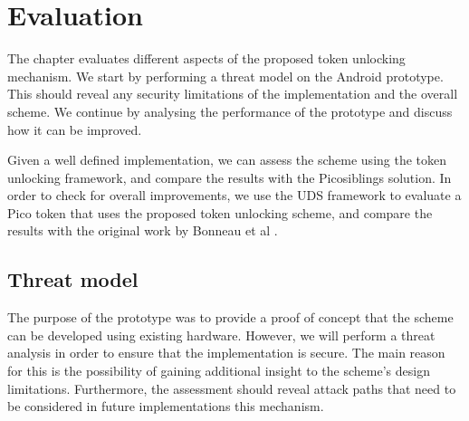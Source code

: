 
\chapter{Evaluation} %

\label{Chapter6} %


The chapter evaluates different aspects of the proposed token unlocking mechanism. We start by performing a threat model on the Android prototype. This should reveal any security limitations of the implementation and the overall scheme. We continue by analysing the performance of the prototype and discuss how it can be improved.

Given a well defined implementation, we can assess the scheme using the token unlocking framework, and compare the results with the Picosiblings solution. In order to check for overall improvements, we use the UDS framework to evaluate a Pico token that uses the proposed token unlocking scheme, and compare the results with the original work by Bonneau et al \cite{bonneau2012quest}.

\section{Threat model}

The purpose of the prototype was to provide a proof of concept that the scheme can be developed using existing hardware. However, we will perform a threat analysis in order to ensure that the implementation is secure. The main reason for this is the possibility of gaining additional insight to the scheme's design limitations. Furthermore, the assessment should reveal attack paths that need to be considered in future implementations this mechanism.


